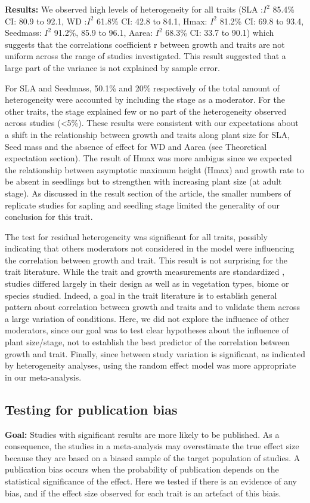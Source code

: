\documentclass[a4paper]{article}\usepackage[]{graphicx}\usepackage[]{color}
\begin{document}
\begin{appendices}
\textbf{Results:} We observed high levels of heterogeneity for all traits (SLA :$I^{2}$ 85.4\% CI: 80.9 to 92.1, WD :$I^{2}$ 61.8\% CI: 42.8 to 84.1, Hmax: $I^{2}$ 81.2\% CI: 69.8 to 93.4, Seedmass: $I^{2}$ 91.2\%, 85.9 to 96.1, Aarea: $I^{2}$ 68.3\% CI: 33.7 to 90.1) which suggests that the correlations coefficient r between growth and traits are not uniform across the range of studies investigated. This result suggested that a large part of the variance is not explained by sample error.

For SLA and Seedmass, 50.1\% and 20\% respectively of the total amount of heterogeneity were accounted by including the stage as a moderator. For the other traits, the stage explained few or no part of the heterogeneity observed across studies (<5\%). These results were consistent with our expectations about a shift in the relationship between growth and traits along plant size for SLA, Seed mass and the absence of effect for WD and Aarea (see Theoretical expectation section). The result of Hmax was more ambigus since we expected the relationship between asymptotic maximum height (Hmax) and growth rate to be absent in seedlings but to strengthen with increasing plant size (at adult stage). As discussed in the result section of the article, the smaller numbers of replicate studies for sapling and seedling stage limited the generality of our conclusion for this trait. 

The test for residual heterogeneity was significant for all traits, possibly indicating that others moderators not considered in the model were influencing the correlation between growth and trait. This result is not surprising for the trait literature. While the trait and growth measurements are standardized \citep{Cornelissen:2003gw}, studies differed largely in their design as well as in vegetation types, biome or species studied. Indeed, a goal in the trait literature is to establish general pattern about correlation between growth and traits and to validate them across a large variation of conditions. Here, we did not explore the influence of other moderators, since our goal was to test clear hypotheses about the influence of plant size/stage, not to establish the best predictor of the correlation between growth and trait. Finally, since between study variation is significant, as indicated by heterogeneity analyses, using the random effect model was more appropriate in our meta-analysis.

\subsection{Testing for publication bias}
\textbf{Goal:} Studies with significant results are more likely to be published. As a consequence, the studies in a meta-analysis may overestimate the true effect size because they are based on a biased sample of the target population of studies. A publication bias occurs when the probability of publication depends on the statistical significance of the effect. Here we tested if there is an evidence of any bias, and if the effect size observed for each trait is an artefact of this biais.


\end{appendices}
\end{document}
